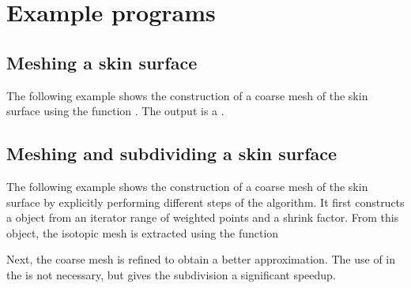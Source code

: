 \section{Example programs}
\subsection{Meshing a skin surface}
The following example shows the construction of a coarse mesh of the
skin surface using the function . The
output is a .

\subsection{Meshing and subdividing a skin surface}
The following example shows the construction of a coarse mesh of the
skin surface by explicitly performing different steps of the
algorithm. It first constructs a  object from an
iterator range of weighted points and a shrink factor. From this
object, the isotopic mesh is extracted using the function 

Next, the coarse mesh is refined to obtain a better approximation. The
use of  in
the  is not necessary, but gives the subdivision
a significant speedup.



